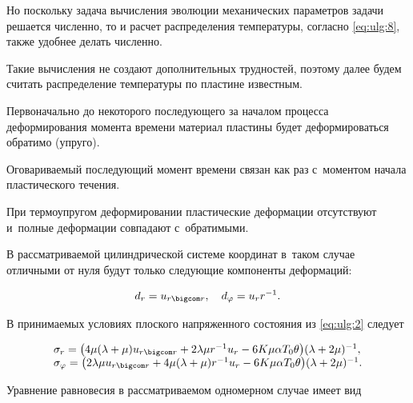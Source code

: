 Но поскольку задача вычисления эволюции механических параметров задачи решается численно,  то и расчет  распределения температуры, согласно \eqref{eq:ulg:8}, также удобнее делать численно. 

Такие вычисления не создают дополнительных трудностей, поэтому далее будем считать распределение температуры по пластине известным.



Первоначально до некоторого последующего за началом процесса деформирования момента времени материал пластины будет деформироваться обратимо (упруго). 

Оговариваемый последующий момент времени связан как раз с~моментом начала пластического течения. 

При термоупругом деформировании пластические деформации отсутствуют и~полные деформации совпадают с~обратимыми. 

В рассматриваемой цилиндрической системе координат в~таком случае отличными от нуля будут только следующие компоненты деформаций:

\begin{equation} 

d_{r} =u_{r\bigcom r}, \quad 

d_{\varphi } =u_{r} r^{-1} . 

\end{equation}

 

В принимаемых условиях плоского напряженного состояния из \eqref{eq:ulg:2} следует

\begin{equation} 

\label{eq:ulg:9} 

\begin{array}{l} 

\sigma _{r} = \bigl(4\mu (\lambda +\mu )u_{r\bigcom r} +2\lambda \mu r^{-1} u_{r} -6K\mu \alpha T_{0} \theta \bigr) (\lambda +2\mu )^{-1} , 

\\ 

\sigma _{\varphi } =\bigl(2\lambda \mu u_{r\bigcom r} +4\mu (\lambda +\mu )r^{-1} u_{r} -6K\mu \alpha T_{0} \theta \bigr) (\lambda +2\mu )^{-1} . 

\end{array} 

\end{equation} 

 

 

Уравнение равновесия в рассматриваемом одномерном случае имеет вид

